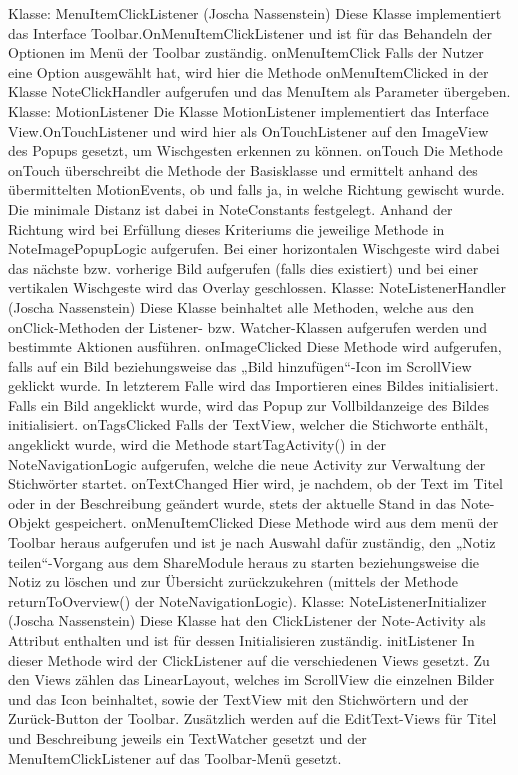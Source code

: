 Klasse: MenuItemClickListener (Joscha Nassenstein)
Diese Klasse implementiert das Interface Toolbar.OnMenuItemClickListener und ist für das Behandeln der Optionen im Menü der Toolbar zuständig.
onMenuItemClick
Falls der Nutzer eine Option ausgewählt hat, wird hier die Methode onMenuItemClicked in der Klasse NoteClickHandler aufgerufen und das MenuItem als Parameter übergeben.
Klasse: MotionListener
Die Klasse MotionListener implementiert das Interface View.OnTouchListener und wird hier als OnTouchListener auf den ImageView des Popups gesetzt, um Wischgesten erkennen zu können.
onTouch
Die Methode onTouch überschreibt die Methode der Basisklasse und ermittelt anhand des übermittelten MotionEvents, ob und falls ja, in welche Richtung gewischt wurde. Die minimale Distanz ist dabei in NoteConstants festgelegt. Anhand der Richtung wird bei Erfüllung dieses Kriteriums die jeweilige Methode in NoteImagePopupLogic aufgerufen. Bei einer horizontalen Wischgeste wird dabei das nächste bzw. vorherige Bild aufgerufen (falls dies existiert) und bei einer vertikalen Wischgeste wird das Overlay geschlossen.
Klasse: NoteListenerHandler (Joscha Nassenstein)
Diese Klasse beinhaltet alle Methoden, welche aus den onClick-Methoden der Listener- bzw. Watcher-Klassen aufgerufen werden und bestimmte Aktionen ausführen.
onImageClicked
Diese Methode wird aufgerufen, falls auf ein Bild beziehungsweise das „Bild hinzufügen“-Icon im ScrollView geklickt wurde. In letzterem Falle wird das Importieren eines Bildes initialisiert. Falls ein Bild angeklickt wurde, wird das Popup zur Vollbildanzeige des Bildes initialisiert.
onTagsClicked
Falls der TextView, welcher die Stichworte enthält, angeklickt wurde, wird die Methode startTagActivity() in der NoteNavigationLogic aufgerufen, welche die neue Activity zur Verwaltung der Stichwörter startet.
onTextChanged
Hier wird, je nachdem, ob der Text im Titel oder in der Beschreibung geändert wurde, stets der aktuelle Stand in das Note-Objekt gespeichert.
onMenuItemClicked
Diese Methode wird aus dem menü der Toolbar heraus aufgerufen und ist je nach Auswahl dafür zuständig, den „Notiz teilen“-Vorgang aus dem ShareModule heraus zu starten beziehungsweise die Notiz zu löschen und zur Übersicht zurückzukehren (mittels der Methode returnToOverview() der NoteNavigationLogic).
Klasse: NoteListenerInitializer (Joscha Nassenstein)
Diese Klasse hat den ClickListener der Note-Activity als Attribut enthalten und ist für dessen Initialisieren zuständig.
initListener
In dieser Methode wird der ClickListener auf die verschiedenen Views gesetzt. Zu den Views zählen das LinearLayout, welches im ScrollView die einzelnen Bilder und das Icon beinhaltet, sowie der TextView mit den Stichwörtern und der Zurück-Button der Toolbar. Zusätzlich werden auf die EditText-Views für Titel und Beschreibung jeweils ein TextWatcher gesetzt und der MenuItemClickListener auf das Toolbar-Menü gesetzt.

